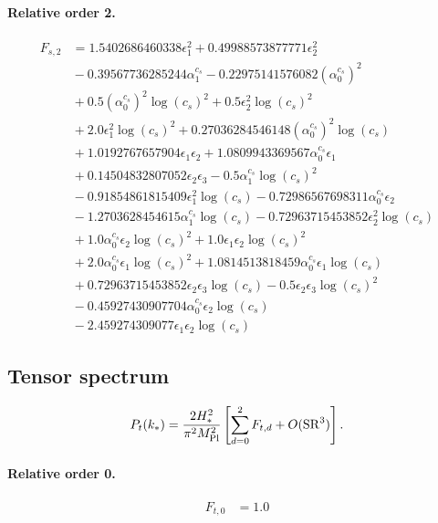 \documentclass[10pt]{article}
\begin{document}
\paragraph{Relative order 2.}
\begin{align*}
F_{s,2} &= 1.5402686460338 \epsilon_{1}^{2} + 0.49988573877771 \epsilon_{2}^{2} \\
&{}  - 0.39567736285244 \alpha_{1}^{c_s} - 0.22975141576082 \left(\alpha_{0}^{c_s}\right)^{2} \\
&{}  + 0.5 \left(\alpha_{0}^{c_s}\right)^{2} \log{\left(c_{s} \right)}^{2} + 0.5 \epsilon_{2}^{2} \log{\left(c_{s} \right)}^{2} \\
&{}  + 2.0 \epsilon_{1}^{2} \log{\left(c_{s} \right)}^{2} + 0.27036284546148 \left(\alpha_{0}^{c_s}\right)^{2} \log{\left(c_{s} \right)} \\
&{}  + 1.0192767657904 \epsilon_{1} \epsilon_{2} + 1.0809943369567 \alpha_{0}^{c_s} \epsilon_{1} \\
&{}  + 0.14504832807052 \epsilon_{2} \epsilon_{3} - 0.5 \alpha_{1}^{c_s} \log{\left(c_{s} \right)}^{2} \\
&{}  - 0.91854861815409 \epsilon_{1}^{2} \log{\left(c_{s} \right)} - 0.72986567698311 \alpha_{0}^{c_s} \epsilon_{2} \\
&{}  - 1.2703628454615 \alpha_{1}^{c_s} \log{\left(c_{s} \right)} - 0.72963715453852 \epsilon_{2}^{2} \log{\left(c_{s} \right)} \\
&{}  + 1.0 \alpha_{0}^{c_s} \epsilon_{2} \log{\left(c_{s} \right)}^{2} + 1.0 \epsilon_{1} \epsilon_{2} \log{\left(c_{s} \right)}^{2} \\
&{}  + 2.0 \alpha_{0}^{c_s} \epsilon_{1} \log{\left(c_{s} \right)}^{2} + 1.0814513818459 \alpha_{0}^{c_s} \epsilon_{1} \log{\left(c_{s} \right)} \\
&{}  + 0.72963715453852 \epsilon_{2} \epsilon_{3} \log{\left(c_{s} \right)} - 0.5 \epsilon_{2} \epsilon_{3} \log{\left(c_{s} \right)}^{2} \\
&{}  - 0.45927430907704 \alpha_{0}^{c_s} \epsilon_{2} \log{\left(c_{s} \right)} \\
&{}  - 2.459274309077 \epsilon_{1} \epsilon_{2} \log{\left(c_{s} \right)}
\end{align*}

\subsection{Tensor spectrum}
\[P_t(k_*)=\frac{2H_*^2}{\pi^2M_{\rm Pl}^2}\left[\sum_{d=0}^{2}F_{t,d}+O(\mathrm{SR}^{3})\right].\]
\paragraph{Relative order 0.}
\begin{align*}
F_{t,0} &= 1.0
\end{align*}
\end{document}
